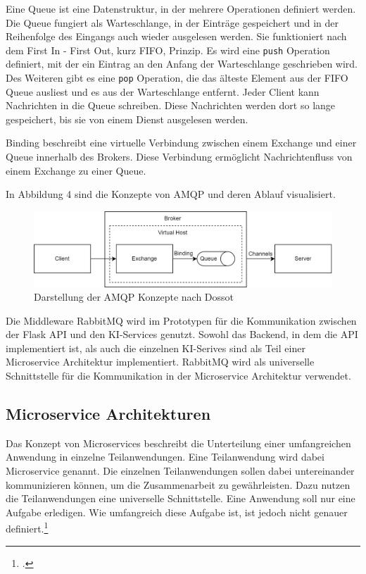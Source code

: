 Eine Queue ist eine Datenstruktur, in der mehrere Operationen definiert werden. Die Queue fungiert als Warteschlange, in der Einträge gespeichert und in der Reihenfolge des Eingangs auch wieder ausgelesen werden. Sie funktioniert nach dem First In - First Out, kurz FIFO, Prinzip. Es wird eine \texttt{push} Operation definiert, mit der ein Eintrag an den Anfang der Warteschlange geschrieben wird. Des Weiteren gibt es eine \texttt{pop} Operation, die das älteste Element aus der FIFO Queue ausliest und es aus der Warteschlange entfernt. Jeder Client kann Nachrichten in die Queue schreiben. Diese Nachrichten werden dort so lange gespeichert, bis sie von einem Dienst ausgelesen werden. 

Binding beschreibt eine virtuelle Verbindung zwischen einem Exchange und einer Queue innerhalb des Brokers. Diese Verbindung ermöglicht Nachrichtenfluss von einem Exchange zu einer Queue.

In Abbildung 4 sind die Konzepte von AMQP und deren Ablauf visualisiert.

\begin{figure}[H]
  \centering
    \includegraphics[width = 15cm]{bilder/Rabbit4}
    \caption{Darstellung der AMQP Konzepte nach Dossot}
\end{figure}


Die Middleware RabbitMQ wird im Prototypen für die Kommunikation zwischen der Flask API und den KI-Services genutzt. Sowohl das Backend, in dem die API implementiert ist, als auch die einzelnen KI-Serives sind als Teil einer Microservice Architektur implementiert. RabbitMQ wird als universelle Schnittstelle für die Kommunikation in der Microservice Architektur verwendet. 

\subsection{Microservice Architekturen}
Das Konzept von Microservices beschreibt die Unterteilung einer umfangreichen Anwendung in einzelne Teilanwendungen. Eine Teilanwendung wird dabei Microservice genannt. Die einzelnen Teilanwendungen sollen dabei untereinander kommunizieren können, um die Zusammenarbeit zu gewährleisten. Dazu nutzen die Teilanwendungen eine universelle Schnittstelle. Eine Anwendung soll nur eine Aufgabe erledigen. Wie umfangreich diese Aufgabe ist, ist jedoch nicht genauer definiert.\footcite{wolff2018microservices}

